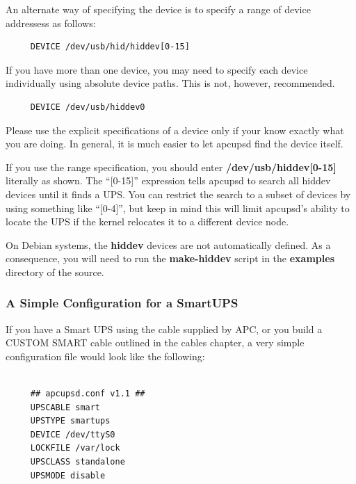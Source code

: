 An alternate way of specifying the device is to specify a range of device
addressess as follows: 

\footnotesize
\begin{verbatim}
     DEVICE /dev/usb/hid/hiddev[0-15]
\end{verbatim}
\normalsize

If you have more than one device, you may need to specify each device
individually using absolute device paths. This is not, however, recommended. 

\footnotesize
\begin{verbatim}
     DEVICE /dev/usb/hiddev0
\end{verbatim}
\normalsize

Please use the explicit specifications of a device only if your know exactly
what you are doing. In general, it is much easier to let apcupsd find the
device itself.  

If you use the range specification, you should enter {\bf
/dev/usb/hiddev[0-15]} literally as shown.  The ``[0-15]'' expression tells
apcupsd to search all hiddev devices until it finds a UPS. You can restrict
the search to a subset of devices by using something like ``[0-4]'', but keep
in mind this will limit apcupsd's ability to locate the UPS if the kernel
relocates it to a different device node.  

On Debian systems, the {\bf hiddev} devices are not automatically defined. As
a consequence, you will need to run the {\bf make-hiddev} script in the {\bf
examples} directory of the source. 

\label{A-Simple-Configuration-for-a-SmartUPS}

\subsubsection*{A Simple Configuration for a SmartUPS}

\label{index-Configuration_002c-SmartUPS-68}
\label{index-SmartUPS-configuration-69}
\label{index-Example_002c-SmartUPS-conf-70}
If you have a Smart UPS using the cable supplied by APC, or you build a CUSTOM
SMART cable outlined in the cables chapter, a very simple configuration file
would look like the following: 

\footnotesize
\begin{verbatim}
     
     ## apcupsd.conf v1.1 ##
     UPSCABLE smart
     UPSTYPE smartups
     DEVICE /dev/ttyS0
     LOCKFILE /var/lock
     UPSCLASS standalone
     UPSMODE disable
\end{verbatim}
\normalsize

